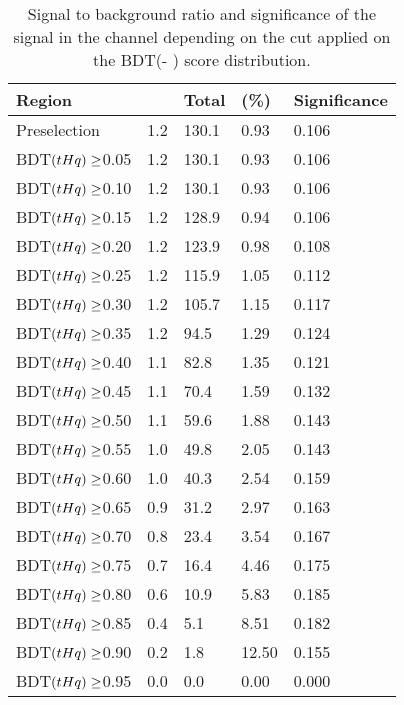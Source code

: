 \begin{table}[]
\centering
\begin{tabular}{|l|l|l|l|l|}
\toprule
Region       			& \tHq & Total & \StoB (\%) & Significance \\ \midrule
Preselection 			& 1.2 & 130.1 & 0.93    & 0.106             \\
BDT$(tHq) \geq$0.05       & 1.2 & 130.1 & 0.93    & 0.106             \\
BDT$(tHq) \geq$0.10       & 1.2 & 130.1 & 0.93    & 0.106             \\
BDT$(tHq) \geq$0.15       & 1.2 & 128.9 & 0.94    & 0.106             \\
BDT$(tHq) \geq$0.20       & 1.2 & 123.9 & 0.98    & 0.108             \\
BDT$(tHq) \geq$0.25       & 1.2 & 115.9 & 1.05    & 0.112             \\
BDT$(tHq) \geq$0.30       & 1.2 & 105.7 & 1.15    & 0.117             \\
BDT$(tHq) \geq$0.35       & 1.2 & 94.5  & 1.29    & 0.124             \\
BDT$(tHq) \geq$0.40       & 1.1 & 82.8  & 1.35    & 0.121             \\
BDT$(tHq) \geq$0.45       & 1.1 & 70.4  & 1.59    & 0.132             \\
BDT$(tHq) \geq$0.50       & 1.1 & 59.6  & 1.88    & 0.143             \\
BDT$(tHq) \geq$0.55       & 1.0 & 49.8  & 2.05    & 0.143             \\
BDT$(tHq) \geq$0.60       & 1.0 & 40.3  & 2.54    & 0.159             \\
BDT$(tHq) \geq$0.65       & 0.9 & 31.2  & 2.97    & 0.163             \\
BDT$(tHq) \geq$0.70       & 0.8 & 23.4  & 3.54    & 0.167             \\
BDT$(tHq) \geq$0.75       & 0.7 & 16.4  & 4.46    & 0.175             \\
BDT$(tHq) \geq$0.80       & 0.6 & 10.9  & 5.83    & 0.185             \\
BDT$(tHq) \geq$0.85       & 0.4 & 5.1   & 8.51    & 0.182             \\
BDT$(tHq) \geq$0.90       & 0.2 & 1.8   & 12.50   & 0.155             \\
BDT$(tHq) \geq$0.95       & 0.0 & 0.0   & 0.00    & 0.000            \\ \bottomrule
\end{tabular}
\caption{Signal to background ratio and significance of the \tHq signal in the \dilepSStau channel
depending on the cut applied on the BDT(\tHq - \dilepSStau) score distribution.}
\label{tab:ChaptH:EventSelection:SR:SS:BDT_score_distribution}
\end{table}


